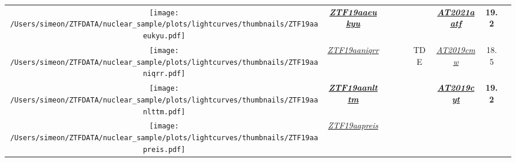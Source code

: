 \begin{table*}
{\begin{tabular}{c c  c  c  c   c  c  c}
      \parbox[c]{12em}{\texttt{[image: /Users/simeon/ZTFDATA/nuclear\_sample/plots/lightcurves/thumbnails/ZTF19aaeukyu.pdf]}} & \textbf{\textit{\href{https://ztfnuclear.simeonreusch.com/transient/ZTF19aaeukyu}{ZTF19aaeukyu}}} & ~             & ~                       & ~                                                                 &
      \textbf{\textit{\href{https://www.wis-tns.org/object/2021aatf}{AT2021aatf}}}                                                                & \textbf{19.2}                                                                                     &                                                                                                                                                                \\
      \parbox[c]{12em}{\texttt{[image: /Users/simeon/ZTFDATA/nuclear\_sample/plots/lightcurves/thumbnails/ZTF19aaniqrr.pdf]}} & \textit{\href{https://ztfnuclear.simeonreusch.com/transient/ZTF19aaniqrr}{ZTF19aaniqrr}}
                                                                                                                                                  & ~                                                                                                 & ~             & TDE                     &
      \textit{\href{https://www.wis-tns.org/object/2019cmw}{AT2019cmw}}                                                                           & 18.5                                                                                              &                                                                                                                                                                \\
      \parbox[c]{12em}{\texttt{[image: /Users/simeon/ZTFDATA/nuclear\_sample/plots/lightcurves/thumbnails/ZTF19aanlttm.pdf]}} & \textbf{\textit{\href{https://ztfnuclear.simeonreusch.com/transient/ZTF19aanlttm}{ZTF19aanlttm}}} & ~             & ~                       & ~                                                                 &
      \textbf{\textit{\href{https://www.wis-tns.org/object/2019cyt}{AT2019cyt}}}                                                                  & \textbf{19.2}                                                                                     &                                                                                                                                                                \\
      \parbox[c]{12em}{\texttt{[image: /Users/simeon/ZTFDATA/nuclear\_sample/plots/lightcurves/thumbnails/ZTF19aapreis.pdf]}} & \textit{\href{https://ztfnuclear.simeonreusch.com/transient/ZTF19aapreis}{ZTF19aapreis}}

\end{tabular}}
\end{table*}
